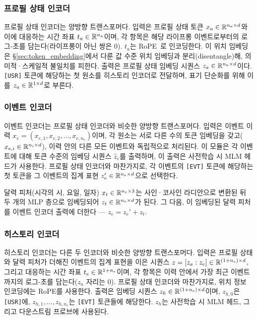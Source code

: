\subsubsection{프로필 상태 인코더}
프로필 상태 인코더는 양방향 트랜스포머다.
입력은 프로필 상태 토큰 $x_a \in \mathbb{R}^{n_a \times d}$와 이에 대응하는 시간 좌표 $t_a \in \mathbb{R}^{n_a}$이며, 각 항목은 해당 라이프롱 이벤트로부터의 로그-초를 담는다(라이프롱이 아닌 쌍은 $0$).
$t_a$는 RoPE~\citep{su2024roformer}로 인코딩한다.
이 위치 임베딩은 \S\ref{sec:token_embedding}에서 다룬 값 수준 위치 임베딩과 분리(disentangle)해, 의미적·스케일적 불일치를 피한다.
출력은 프로필 상태 임베딩 시퀀스 $z_a\in \mathbb{R}^{n_a \times d}$이다.
\texttt{[USR]} 토큰에 해당하는 첫 원소를 히스토리 인코더로 전달하며, 표기 단순화를 위해 이를 $z_a\in \mathbb{R}^{1 \times d}$로 부른다.

\subsubsection{이벤트 인코더}
\label{sec:event_encoder}
이벤트 인코더는 프로필 상태 인코더와 비슷한 양방향 트랜스포머다.
입력은 이벤트 이력 $x_e = (x_{e, 1}, x_{e, 2}, \dots, x_{e, n_e})$이며, 각 원소는 서로 다른 수의 토큰 임베딩을 갖고($x_{e,i} \in \mathbb{R}^{n_i \times d}$), 이력 안의 다른 모든 이벤트와 독립적으로 처리된다.
이 모듈은 각 이벤트에 대해 토큰 수준의 임베딩 시퀀스 $\widehat{z}_e$를 출력하며, 이 출력은 사전학습 시 MLM 헤드가 사용한다.
프로필 상태 인코더와 마찬가지로, 각 이벤트의 \texttt{[EVT]} 토큰에 해당하는 첫 토큰을 그 이벤트의 집계 표현 $z_e' \in \mathbb{R}^{n_e \times d}$으로 선택한다.

달력 피처(시각의 시, 요일, 일자) $x_t\in \mathbb{R}^{n_e\times 3}$는 사인·코사인 라디안으로 변환된 뒤 두 개의 MLP 층으로 임베딩되어 $z_t\in \mathbb{R}^{n_e \times d}$가 된다.
그 다음, 이 임베딩된 달력 피처를 이벤트 인코더 출력에 더한다 — $z_e = z_e' + z_t$.

\subsubsection{히스토리 인코더}
히스토리 인코더는 다른 두 인코더와 비슷한 양방향 트랜스포머다.
입력은 프로필 상태와 달력 피처가 더해진 이벤트의 집계 표현을 이은 시퀀스 $z=[z_a:z_e] \in \mathbb{R}^{(1+n_e) \times d}$, 그리고 대응하는 시간 좌표 $t_e \in \mathbb{R}^{1+n_e}$이며, 각 항목은 이력 안에서 가장 최근 이벤트까지의 로그-초를 담는다($z_a$ 자리는 $0$).
프로필 상태 인코더와 마찬가지로, 위치 정보 인코딩에는 RoPE를 사용한다.
출력은 임베딩 시퀀스 $z_h\in \mathbb{R}^{(1+n_e)\times d}$이며, $z_{h,0}$은 \texttt{[USR]}에, $z_{h,1},\dots,z_{h,n_e}$는 \texttt{[EVT]} 토큰들에 해당한다.
$z_h$는 사전학습 시 MLM 헤드, 그리고 다운스트림 프로브에 사용된다.

